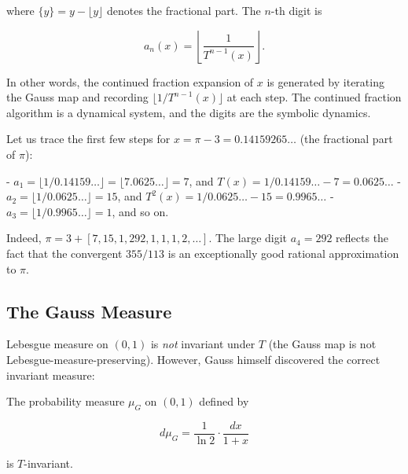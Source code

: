 where $\{y\} = y - \lfloor y \rfloor$ denotes the fractional part. The $n$-th digit is

\[
a_n(x) = \left\lfloor \frac{1}{T^{n-1}(x)} \right\rfloor.
\]

In other words, the continued fraction expansion of $x$ is generated by iterating the Gauss map and recording $\lfloor 1/T^{n-1}(x) \rfloor$ at each step. The continued fraction algorithm is a dynamical system, and the digits are the symbolic dynamics.

\begin{example}
Let us trace the first few steps for $x = \pi - 3 = 0.14159265\ldots$ (the fractional part of $\pi$):

- $a_1 = \lfloor 1/0.14159\ldots \rfloor = \lfloor 7.0625\ldots \rfloor = 7$, and $T(x) = 1/0.14159\ldots - 7 = 0.0625\ldots$
- $a_2 = \lfloor 1/0.0625\ldots \rfloor = 15$, and $T^2(x) = 1/0.0625\ldots - 15 = 0.9965\ldots$
- $a_3 = \lfloor 1/0.9965\ldots \rfloor = 1$, and so on.

Indeed, $\pi = 3 + [7, 15, 1, 292, 1, 1, 1, 2, \ldots]$. The large digit $a_4 = 292$ reflects the fact that the convergent $355/113$ is an exceptionally good rational approximation to $\pi$.
\end{example}


\subsection{The Gauss Measure}\label{sec:12.5.2}

Lebesgue measure on $(0, 1)$ is \textit{not} invariant under $T$ (the Gauss map is not Lebesgue-measure-preserving). However, Gauss himself discovered the correct invariant measure:

\begin{proposition}\label{prop:12.15.}
The probability measure $\mu_G$ on $(0, 1)$ defined by

\[
d\mu_G = \frac{1}{\ln 2} \cdot \frac{dx}{1 + x}
\]

is $T$-invariant.
\end{proposition}


